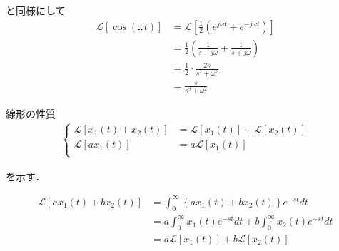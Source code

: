 \documentclass[a4paper,12pt]{article}
\begin{document}
\begin{tcolorbox}[title={[6] 余弦波関数 \( x(t) = \cos(\omega t) \) をラプラス変換せよ．}]
  
  \quad [5]と同様にして
  \vspace{-2mm}
  \begin{align*}
  \mathcal{L} \left[ \cos(\omega t) \right] &=
  \mathcal{L} \left[ \frac{1}{2}\left( e^{j \omega t} + e^{-j \omega t} \right) \right] \\
  &=\frac{1}{2} \left( \frac{1}{s-j \omega} + \frac{1}{s + j \omega} \right) \\
  &=\frac{1}{2} \cdot \frac{2s}{s^2 + \omega^2} \\
  &=\frac{s}{s^2 + \omega^2}
  \end{align*}
  
\end{tcolorbox}
\begin{tcolorbox}[title={[7] ラプラス変換は線形の性質があることを示せ. }]


  \quad 線形の性質
  \vspace{-3mm}
  \begin{align*}
      \left\{
          \begin{aligned}
          \mathcal{L} \left[ x_{1}(t) + x_{2}(t) \right] &=
          \mathcal{L} \left[ x_{1}(t)  \right] +
          \mathcal{L} \left[ x_{2}(t)  \right] \\
          \mathcal{L} \left[ a x_{1}(t)  \right] &=
          a \mathcal{L} \left[ x_{1}(t)  \right] \\
          \end{aligned}
      \right.
  \end{align*}

  \quad を示す．
  \vspace{-3mm}

  \begin{align*}
      \mathcal{L} \left[ a x_{1}(t) + b x_{2}(t) \right] &=
      \int_{0}^{\infty} \left\{ a x_{1}(t) + b x_{2}(t) \right\} e^{-st} dt \\
      &=a \int_{0}^{\infty} x_{1}(t) e^{-st} dt + b \int_{0}^{\infty} x_{2}(t) e^{-st} dt \\
      &=a \mathcal{L} \left[ x_{1}(t)  \right] +
      b \mathcal{L} \left[ x_{2}(t)  \right] \\
  \end{align*}



\vspace{2mm}
  \end{tcolorbox}
\end{document}
